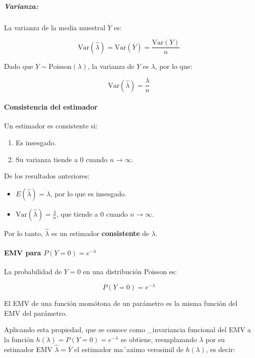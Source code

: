 \documentclass[
]{article}
\providecommand{\tightlist}{%
  \setlength{\itemsep}{0pt}\setlength{\parskip}{0pt}}
\begin{document}
\subparagraph{Varianza:}\label{varianza}

La varianza de la media muestral \(\overline{Y}\) es:

\[
\text{Var}(\hat{\lambda}) = \text{Var}(\overline{Y}) = \frac{\text{Var}(Y)}{n}
\]

Dado que \(Y \sim \text{Poisson}(\lambda)\), la varianza de \(Y\) es \(\lambda\), por lo que:

\[
\text{Var}(\hat{\lambda}) = \frac{\lambda}{n}
\]

\paragraph{Consistencia del estimador}\label{consistencia-del-estimador}

Un estimador es consistente si:

\begin{enumerate}
\def\labelenumi{\arabic{enumi}.}
\tightlist
\item
  Es insesgado.
\item
  Su varianza tiende a 0 cuando \(n \to \infty\).
\end{enumerate}

De los resultados anteriores:

\begin{itemize}
\tightlist
\item
  \(E(\hat{\lambda}) = \lambda\), por lo que es insesgado.
\item
  \(\text{Var}(\hat{\lambda}) = \frac{\lambda}{n}\), que tiende a 0 cuando \(n \to \infty\).
\end{itemize}

Por lo tanto, \(\hat{\lambda}\) es un estimador \textbf{consistente} de \(\lambda\).

\paragraph{\texorpdfstring{EMV para \(P(Y = 0) = e^{-\lambda}\)}{EMV para P(Y = 0) = e\^{}\{-\textbackslash lambda\}}}\label{emv-para-py-0-e-lambda}

La probabilidad de \(Y = 0\) en una distribución Poisson es:

\[
P(Y = 0) = e^{-\lambda}
\]

El EMV de una función momótona de un parámetro es la misma función del EMV del parámetro.

Aplicando esta propiedad, que se conoce como \_invariancia funcional del EMV a la función \(h(\lambda)= P(Y = 0)= e^{-\lambda}\) se obtiene, reemplazando \(\lambda\) por su estimador EMV \(\hat{\lambda} = \overline{Y}\) el estimador ma´aximo verosimil de \(h(\lambda)\), es decir:
\end{document}
